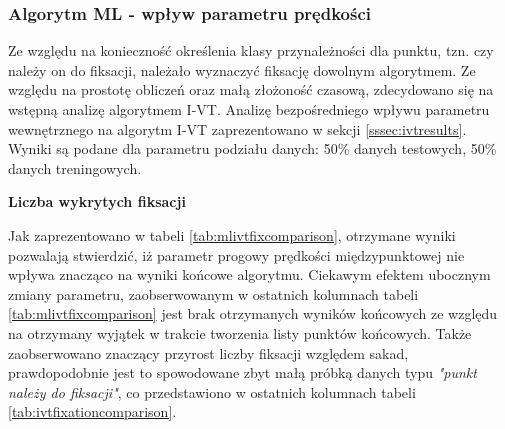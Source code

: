 \subsubsection{Algorytm ML - wpływ parametru prędkości}
\label{sssec:mlivt}
Ze względu na konieczność określenia klasy przynależności dla punktu, tzn. czy należy on do fiksacji, należało wyznaczyć fiksację dowolnym algorytmem. Ze względu na prostotę obliczeń oraz małą złożoność czasową, zdecydowano się na wstępną analizę algorytmem I-VT. Analizę bezpośredniego wpływu parametru wewnętrznego na algorytm I-VT zaprezentowano w sekcji \ref{sssec:ivtresults}. Wyniki są podane dla parametru podziału danych: 50\% danych testowych, 50\% danych treningowych.\par
\textbf{Liczba wykrytych fiksacji}\par
Jak zaprezentowano w tabeli \ref{tab:mlivtfixcomparison}, otrzymane wyniki pozwalają stwierdzić, iż parametr progowy prędkości międzypunktowej nie wpływa znacząco na wyniki końcowe algorytmu. Ciekawym efektem ubocznym zmiany parametru, zaobserwowanym w ostatnich kolumnach tabeli \ref{tab:mlivtfixcomparison} jest brak otrzymanych wyników końcowych ze względu na otrzymany wyjątek w trakcie tworzenia listy punktów końcowych. Także zaobserwowano znaczący przyrost liczby fiksacji względem sakad, prawdopodobnie jest to spowodowane zbyt małą próbką danych typu \emph{"punkt należy do fiksacji"}, co przedstawiono w ostatnich kolumnach tabeli \ref{tab:ivtfixationcomparison}.\par
